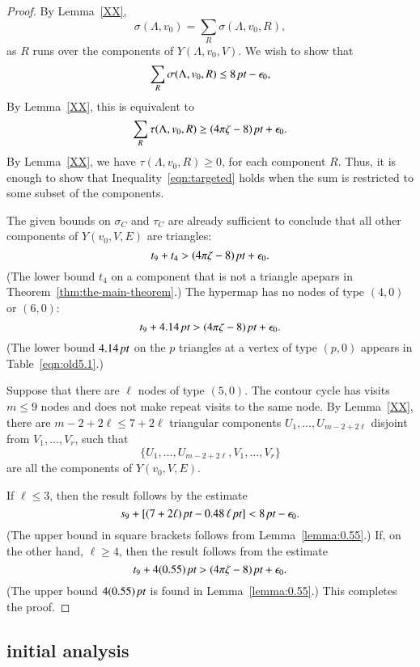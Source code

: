 \begin{proof}  
By Lemma~\ref{XX},
  $$
  \sigma(\Lambda,v_0) = \sum_{R}\sigma(\Lambda,v_0,R),
  $$
as $R$ runs over the components of $Y(\Lambda,v_0,V)$.
We wish to show that
  $$
  \sum_{R}\sigma(\Lambda,v_0,R)\le 8\,\hbox{\it pt} -\epsilon_0,
  $$
By Lemma~\ref{XX}, this is equivalent to
  \begin{equation}
  \sum_{R} \tau(\Lambda,v_0,R)\ge (4\pi\zeta-8)\,\hbox{\it pt}+\epsilon_0.
  \label{eqn:targeted}
  \end{equation}
By Lemma~\ref{XX}, we have $\tau(\Lambda,v_0,R)\ge0$, for
each component $R$.  Thus, it is enough to show that
Inequality~\ref{eqn:targeted} holds when the sum is restricted
to some subset of the components.

The given bounds on $\sigma_C$ and $\tau_C$ are
already sufficient to conclude that all other components of
$Y(v_0,V,E)$ are triangles:
   $$
   t_9 + t_4 > (4\pi\zeta -8)\,\hbox{\it pt} + \epsilon_0.
   $$
(The lower bound $t_4$ on a component that is not a triangle apepars
in Theorem~\ref{thm:the-main-theorem}.)
The hypermap has no nodes of type $(4,0)$ or $(6,0)$:
$$
   t_9 + 4.14\,\hbox{\it pt} > (4\pi\zeta-8)\,\hbox{\it pt} + \epsilon_0.
$$
(The lower bound $4.14\,\hbox{\it pt}$ on the $p$ triangles at a vertex
of type $(p,0)$ appears in Table~\ref{eqn:old5.1}.)

Suppose that there are $\ell$ nodes of type $(5,0)$.  The
contour cycle has visits  $m\le 9$ nodes and does
not make repeat visits to the same node.  By Lemma~\ref{XX}, 
there are $m-2 + 2\ell\le 7+2\ell$ 
triangular components $U_1,\ldots,U_{m-2+2\ell}$
disjoint from $V_1,\ldots,V_r$, such that
   $$
   \{U_1,\ldots,U_{m-2+2\ell},V_1,\ldots,V_r\}
   $$
are all the components of $Y(v_0,V,E)$.

If $\ell\le 3$, then the result follows by the estimate
   $$
   s_9 + [(7+2\ell)\,\hbox{\it pt} - 0.48\,\ell\,\hbox{\it pt}] < 8\,\hbox{\it pt} - \epsilon_0.
   $$
(The upper bound in square brackets follows from Lemma~\ref{lemma:0.55}.)
If, on the other hand, $\ell\ge 4$, then the result follows from
the estimate
   $$
   t_9 + 4 (0.55)\,\hbox{\it pt} > (4\pi\zeta -8)\,\hbox{\it pt} + \epsilon_0.
   $$
(The upper bound $4(0.55)\,\hbox{\it pt}$ is found in Lemma~\ref{lemma:0.55}.)
This completes the proof.
\end{proof}

\subsection{initial analysis}

